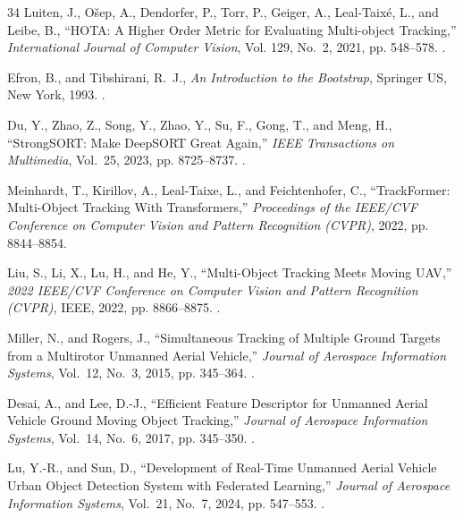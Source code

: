 \documentclass[journal]{new-aiaa}
\begin{document}
\begin{thebibliography}{34}
Luiten, J., O\v{s}ep, A., Dendorfer, P., Torr, P., Geiger, A., Leal-Taix\'{e},
  L., and Leibe, B., \enquote{{HOTA: A Higher Order Metric for Evaluating
  Multi-object Tracking},} \emph{International Journal of Computer Vision},
  Vol. 129, No.~2, 2021, pp. 548--578.
\newblock {}.

Efron, B., and Tibshirani, R.~J., \emph{An Introduction to the Bootstrap},
  Springer US, New York, 1993.
\newblock {}.

Du, Y., Zhao, Z., Song, Y., Zhao, Y., Su, F., Gong, T., and Meng, H.,
  \enquote{{StrongSORT: Make DeepSORT Great Again},} \emph{IEEE Transactions on
  Multimedia}, Vol.~25, 2023, pp. 8725--8737.
\newblock {}.

Meinhardt, T., Kirillov, A., Leal-Taixe, L., and Feichtenhofer, C.,
  \enquote{{TrackFormer: Multi-Object Tracking With Transformers},}
  \emph{Proceedings of the IEEE/CVF Conference on Computer Vision and Pattern
  Recognition (CVPR)}, 2022, pp. 8844--8854.

Liu, S., Li, X., Lu, H., and He, Y., \enquote{{Multi-Object Tracking Meets
  Moving UAV},} \emph{2022 IEEE/CVF Conference on Computer Vision and Pattern
  Recognition (CVPR)}, IEEE, 2022, pp. 8866--8875.
\newblock {}.

Miller, N., and Rogers, J., \enquote{{Simultaneous Tracking of Multiple Ground
  Targets from a Multirotor Unmanned Aerial Vehicle},} \emph{Journal of
  Aerospace Information Systems}, Vol.~12, No.~3, 2015, pp. 345--364.
\newblock {}.

Desai, A., and Lee, D.-J., \enquote{{Efficient Feature Descriptor for Unmanned
  Aerial Vehicle Ground Moving Object Tracking},} \emph{Journal of Aerospace
  Information Systems}, Vol.~14, No.~6, 2017, pp. 345--350.
\newblock {}.

Lu, Y.-R., and Sun, D., \enquote{{Development of Real-Time Unmanned Aerial
  Vehicle Urban Object Detection System with Federated Learning},}
  \emph{Journal of Aerospace Information Systems}, Vol.~21, No.~7, 2024, pp.
  547--553.
\newblock {}.


\end{thebibliography}
\end{document}
